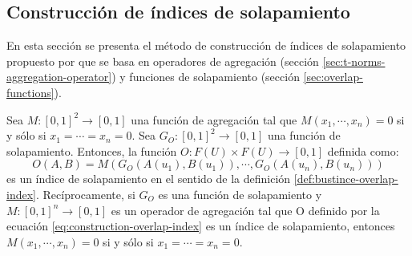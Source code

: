 \subsection{Construcción de índices de solapamiento}\label{sec:overlap-index-construction}
En esta sección se presenta el método de construcción de índices de solapamiento propuesto por \cite{bustince2013overlap} que se basa en operadores de agregación (sección \ref{sec:t-norms-aggregation-operator}) y funciones de solapamiento (sección \ref{sec:overlap-functions}).
\begin{theorem}
Sea $M : [0,1]^{2} \rightarrow [0,1]$ una función de agregación tal que $M(x_{1},\cdots,x_{n}) = 0$ si y sólo si $x_{1} = \cdots = x_{n} = 0$. Sea $G_{O} : [0,1]^{2} \rightarrow [0,1]$ una función de solapamiento. Entonces, la función $O: F(U) \times F(U) \rightarrow [0,1]$ definida como:
\begin{equation}\label{eq:construction-overlap-index}
O(A,B) = M(G_{O}(A(u_{1}),B(u_{1})),\cdots,G_{O}(A(u_{n}),B(u_{n})))
\end{equation}
es un índice de solapamiento en el sentido de la definición \ref{def:bustince-overlap-index}. Recíprocamente, si $G_{O}$ es una función de solapamiento y $M:[0,1]^{n} \rightarrow [0,1]$ es un operador de agregación tal que O definido por la ecuación \ref{eq:construction-overlap-index} es un índice de solapamiento, entonces $M(x_{1},\cdots,x_{n}) = 0$ si y sólo si $x_{1} = \cdots = x_{n} = 0$.
\end{theorem}
